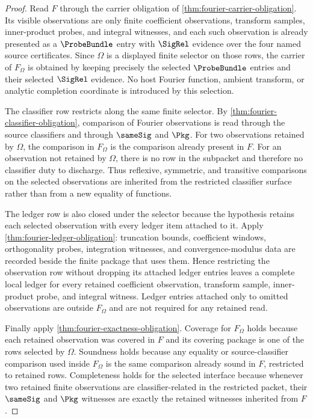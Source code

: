 \begin{proof}
Read $F$ through the carrier obligation of \autoref{thm:fourier-carrier-obligation}. Its visible observations are only finite coefficient observations, transform samples, inner-product probes, and integral witnesses, and each such observation is already presented as a $\ProbeBundle$ entry with $\SigRel$ evidence over the four named source certificates. Since $\Omega$ is a displayed finite selector on those rows, the carrier of $F_{\Omega}$ is obtained by keeping precisely the selected $\ProbeBundle$ entries and their selected $\SigRel$ evidence. No host Fourier function, ambient transform, or analytic completion coordinate is introduced by this selection.

The classifier row restricts along the same finite selector. By \autoref{thm:fourier-classifier-obligation}, comparison of Fourier observations is read through the source classifiers and through $\sameSig$ and $\Pkg$. For two observations retained by $\Omega$, the comparison in $F_{\Omega}$ is the comparison already present in $F$. For an observation not retained by $\Omega$, there is no row in the subpacket and therefore no classifier duty to discharge. Thus reflexive, symmetric, and transitive comparisons on the selected observations are inherited from the restricted classifier surface rather than from a new equality of functions.

The ledger row is also closed under the selector because the hypothesis retains each selected observation with every ledger item attached to it. Apply \autoref{thm:fourier-ledger-obligation}: truncation bounds, coefficient windows, orthogonality probes, integration witnesses, and convergence-modulus data are recorded beside the finite package that uses them. Hence restricting the observation row without dropping its attached ledger entries leaves a complete local ledger for every retained coefficient observation, transform sample, inner-product probe, and integral witness. Ledger entries attached only to omitted observations are outside $F_{\Omega}$ and are not required for any retained read.

Finally apply \autoref{thm:fourier-exactness-obligation}. Coverage for $F_{\Omega}$ holds because each retained observation was covered in $F$ and its covering package is one of the rows selected by $\Omega$. Soundness holds because any equality or source-classifier comparison used inside $F_{\Omega}$ is the same comparison already sound in $F$, restricted to retained rows. Completeness holds for the selected interface because whenever two retained finite observations are classifier-related in the restricted packet, their $\sameSig$ and $\Pkg$ witnesses are exactly the retained witnesses inherited from $F$.


\end{proof}
